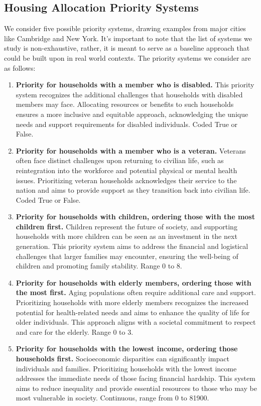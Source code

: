 \documentclass[11pt]{article}
\begin{document}
\subsection{Housing Allocation Priority Systems}
We consider five possible priority systems, drawing examples from major cities like Cambridge and New York. It's important to note that the list of systems we study is non-exhaustive, rather, it is meant to serve as a baseline approach that could be built upon in real world contexts. The priority systems we consider are as follows:
\begin{enumerate}
    \item \textbf{Priority for households with a member who is disabled.} This priority system recognizes the additional challenges that households with disabled members may face. Allocating resources or benefits to such households ensures a more inclusive and equitable approach, acknowledging the unique needs and support requirements for disabled individuals. Coded True or False.
    \item \textbf{Priority for households with a member who is a veteran.} Veterans often face distinct challenges upon returning to civilian life, such as reintegration into the workforce and potential physical or mental health issues. Prioritizing veteran households acknowledges their service to the nation and aims to provide support as they transition back into civilian life. Coded True or False.
    \item \textbf{Priority for households with children, ordering those with the most children first.} Children represent the future of society, and supporting households with more children can be seen as an investment in the next generation. This priority system aims to address the financial and logistical challenges that larger families may encounter, ensuring the well-being of children and promoting family stability.  Range 0 to 8.
    \item \textbf{Priority for households with elderly members, ordering those with the most first.} Aging populations often require additional care and support. Prioritizing households with more elderly members recognizes the increased potential for health-related needs and aims to enhance the quality of life for older individuals. This approach aligns with a societal commitment to respect and care for the elderly. Range 0 to 3.
    \item \textbf{Priority for households with the lowest income, ordering those households first.} Socioeconomic disparities can significantly impact individuals and families. Prioritizing households with the lowest income addresses the immediate needs of those facing financial hardship. This system aims to reduce inequality and provide essential resources to those who may be most vulnerable in society. Continuous, range from 0 to 81900. 
\end{enumerate}
\end{document}
